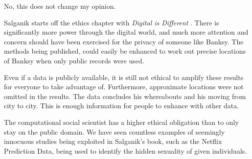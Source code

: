 \documentclass[../ass.tex]{subfiles}
\begin{document}
No, this does not change my opinion. 

Salganik starts off the ethics chapter with \textit{Digital is Different} \cite{salganik_2019}. 
There is significantly more power through the digital world, and much more attention and concern should have been exercised for the privacy of someone like Banksy. 
The methods being published, could easily be enhanced to work out precise locations of Banksy when only public records were used. 

Even if a data is publicly available, it is still not ethical to amplify these results for everyone to take advantage of. 
Furthermore, approximate locations were not omitted in the results. 
The data concludes his whereabouts and his moving from city to city.
This is enough information for people to enhance with other data.

The computational social scientist has a higher ethical obligation than to only stay on the public domain. 
We have seen countless examples of seemingly innocuous studies being exploited in Salganik's book, such as the Netflix Prediction Data, being used to identify the hidden sexuality of given individuals. 
\end{document}
